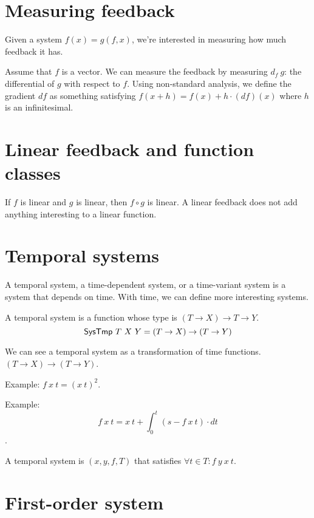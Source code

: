 \section{Measuring feedback}

Given a system \( f(x) = g(f,x) \),
we're interested in measuring how much feedback it has.

Assume that \(f\) is a vector.
We can measure the feedback by measuring \( d_f ~ g \):
the differential of \(g\) with respect to \(f\).
Using non-standard analysis, we define the gradient \( d f \)
as something satisfying \( f(x + h) = f(x) + h \cdot (d f)(x) \)
where \(h\) is an infinitesimal.

\section{Linear feedback and function classes}

If \(f\) is linear and \(g\) is linear, then \(f \circ g\) is linear.
A linear feedback does not add anything interesting to a linear function.

\section{Temporal systems}

A temporal system, a time-dependent system, or a time-variant system is a system that depends on time.
With time, we can define more interesting systems.

\begin{m:def}
    A temporal system is a function whose type is \((T \to X) \to T \to Y\).
\[
    \textsf{SysTmp}~T~X~Y = (T \to X) \to (T \to Y)
\]
\end{m:def}

We can see a temporal system as a transformation of time functions.
\((T \to X) \to (T \to Y)\).

Example:
\(f~x~t = (x~t)^2\).

Example:
\[f~x~t = x~t + \int_0^t (s - f~x~t) \cdot dt\].

\begin{m:def}
    A temporal system is \((x,y,f,T)\) that satisfies
    \(\forall t \in T : f~y~x~t\).
\end{m:def}

\section{First-order system}

